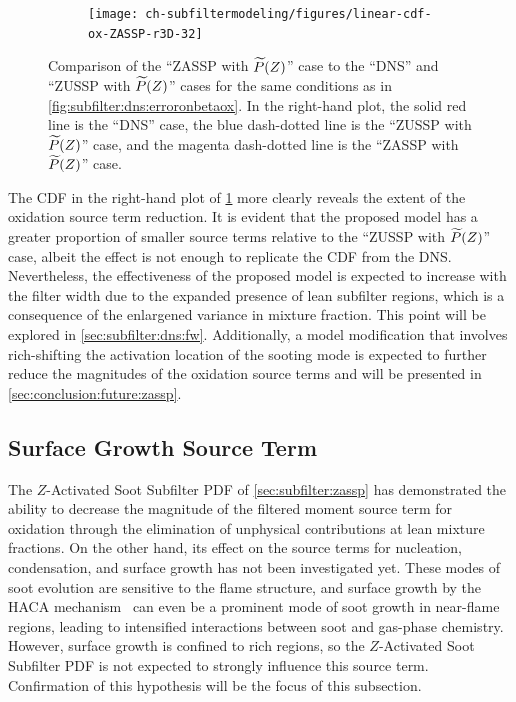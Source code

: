 \begin{figure}[ht]
\begin{subfigure}[b]{0.33\linewidth}
  \end{subfigure}%
  \begin{subfigure}[b]{0.33\linewidth}
    \centering
    \texttt{[image: ch-subfiltermodeling/figures/linear-cdf-ox-ZASSP-r3D-32]}
  \end{subfigure}
  \caption[Comparison of ZASSP with \texorpdfstring{$\pz$}{P(Z)} to DNS \& ZUSSP with \texorpdfstring{$\pz$}{P(Z)} for \texorpdfstring{$\fst[M]{1,0}^{ox}$}{M1,0ox}]{Comparison of the ``ZASSP with $\pz$'' case to the ``DNS'' and ``ZUSSP with $\pz$'' cases for the same conditions as in \cref{fig:subfilter:dns:erroronbetaox}. In the right-hand plot, the solid red line is the ``DNS'' case, the blue dash-dotted line is the ``ZUSSP with $\pz$'' case, and the magenta dash-dotted line is the ``ZASSP with $\pz$'' case.}
  \label{fig:subfilter:dns:zasspcomparisonox}
\end{figure}

The CDF in the right-hand plot of \cref{fig:subfilter:dns:zasspcomparisonox} more clearly reveals the extent of the oxidation source term reduction. It is evident that the proposed model has a greater proportion of smaller source terms relative to the ``ZUSSP with $\pz$'' case, albeit the effect is not enough to replicate the CDF from the DNS. Nevertheless, the effectiveness of the proposed model is expected to increase with the filter width due to the expanded presence of lean subfilter regions, which is a consequence of the enlargened variance in mixture fraction. This point will be explored in \cref{sec:subfilter:dns:fw}. Additionally, a model modification that involves rich-shifting the activation location of the sooting mode is expected to further reduce the magnitudes of the oxidation source terms and will be presented in \cref{sec:conclusion:future:zassp}.


\subsection{Surface Growth Source Term}
\label{sec:subfilter:dns:sg}

The $Z$-Activated Soot Subfilter PDF of \cref{sec:subfilter:zassp} has demonstrated the ability to decrease the magnitude of the filtered moment source term for oxidation through the elimination of unphysical contributions at lean mixture fractions. On the other hand, its effect on the source terms for nucleation, condensation, and surface growth has not been investigated yet. These modes of soot evolution are sensitive to the flame structure, and surface growth by the HACA mechanism~\cite{frenklach1985,frenklach1991} can even be a prominent mode of soot growth in near-flame regions, leading to intensified interactions between soot and gas-phase chemistry. However, surface growth is confined to rich regions, so the $Z$-Activated Soot Subfilter PDF is not expected to strongly influence this source term. Confirmation of this hypothesis will be the focus of this subsection.

